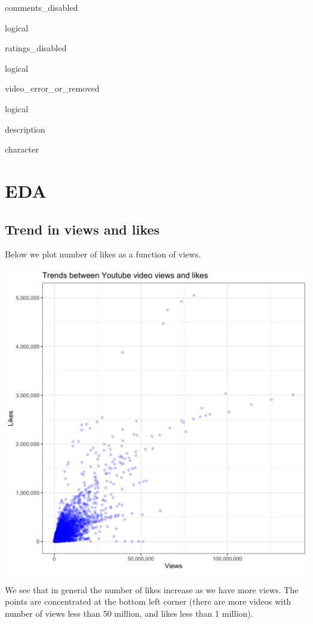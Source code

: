 \documentclass[]{article}
\begin{document}
comments\_disabled

logical

ratings\_disabled

logical

video\_error\_or\_removed

logical

description

character

\hypertarget{eda}{%
\section{EDA}\label{eda}}

\hypertarget{trend-in-views-and-likes}{%
\subsection{Trend in views and likes}\label{trend-in-views-and-likes}}

Below we plot number of likes as a function of views.

\includegraphics{../images/views_likes.png}

We see that in general the number of likes increase as we have more
views. The points are concentrated at the bottom left corner (there are
more videos with number of views less than 50 million, and likes less
than 1 million).
\end{document}
